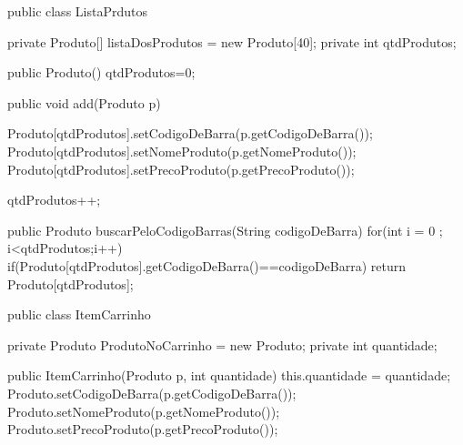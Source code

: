 public class ListaPrdutos{
	
	private Produto[] listaDosProdutos = new Produto[40];
	private int qtdProdutos;

	public Produto(){
		qtdProdutos=0;
	}

	public void add(Produto p){
		Produto[qtdProdutos].setCodigoDeBarra(p.getCodigoDeBarra());
		Produto[qtdProdutos].setNomeProduto(p.getNomeProduto());
		Produto[qtdProdutos].setPrecoProduto(p.getPrecoProduto());

		qtdProdutos++;

	}

	public Produto buscarPeloCodigoBarras(String codigoDeBarra){
		for(int i = 0 ; i<qtdProdutos;i++){
			if(Produto[qtdProdutos].getCodigoDeBarra()==codigoDeBarra){
				return Produto[qtdProdutos];
			}
		}
	}
}

public class ItemCarrinho{
	
	private Produto ProdutoNoCarrinho = new Produto;
	private int quantidade;


	public ItemCarrinho(Produto p, int quantidade){
		this.quantidade = quantidade;
		Produto.setCodigoDeBarra(p.getCodigoDeBarra());
		Produto.setNomeProduto(p.getNomeProduto());
		Produto.setPrecoProduto(p.getPrecoProduto());
	}
}

